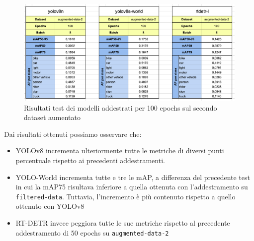 \begin{figure}[ht]
    \centering
    \includegraphics[width=1\textwidth]{files/capitoli/4-sperimentazione-risultati/assets/augmented-data-2(100)-metrics.png}
    \caption{\label{fig:augmented-data-2(100)-metrics}Risultati test dei modelli addestrati per 100 epochs sul secondo dataset aumentato}
\end{figure}

Dai risultati ottenuti possiamo osservare che:

\begin{itemize}
    \item YOLOv8 incrementa ulteriormente tutte le metriche di diversi punti percentuale rispetto ai precedenti addestramenti.
    \item YOLO-World incrementa tutte e tre le mAP, a differenza del precedente test in cui la mAP75 risultava inferiore a quella ottenuta con l'addestramento su \texttt{filtered-data}. Tuttavia, l'incremento è più contenuto rispetto a quello ottenuto con YOLOv8
    \item RT-DETR invece peggiora tutte le sue metriche rispetto al precedente addestramento di 50 epochs su \texttt{augmented-data-2}
\end{itemize}

\clearpage

